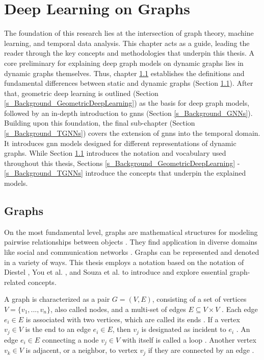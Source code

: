 \section{Deep Learning on Graphs}
\label{s_Background}

The foundation of this research lies at the intersection of graph theory, machine learning, and temporal data analysis. 
This chapter acts as a guide, leading the reader through the key concepts and methodologies that underpin this thesis. A core preliminary for explaining deep graph models on dynamic graphs lies in dynamic graphs themselves. Thus, chapter \ref{s_Background_Graphs} establishes the definitions and fundamental differences between static and dynamic graphs (Section \ref{s_Background_Graphs}). After that, geometric deep learning is outlined (Section \ref{s_Background_GeometricDeepLearning}) as the basis for deep graph models, followed by an in-depth introduction to \glspl{gnn} (Section \ref{s_Background_GNNs}). Building upon this foundation, the final sub-chapter (Section \ref{s_Background_TGNNs}) covers the extension of \glspl{gnn} into the temporal domain. It introduces \gls{gnn} models designed for different representations of dynamic graphs. While Section \ref{s_Background_Graphs} introduces the notation and vocabulary used throughout this thesis, Sections \ref{s_Background_GeometricDeepLearning} - \ref{s_Background_TGNNs} introduce the concepts that underpin the explained models.

\subsection{Graphs}
\label{s_Background_Graphs}
On the most fundamental level, graphs are mathematical structures for modeling pairwise relationships between objects \cite{diestel_graph_2017}. They find application in diverse domains like social and communication networks \cite{bronstein_geometric_2017}. Graphs can be represented and denoted in a variety of ways. This thesis employs a notation based on the notation of Diestel \cite{diestel_graph_2017}, You et al. \cite{you_roland_2022}, and Souza et al. \cite{souza_provably_2022} to introduce and explore essential graph-related concepts.

A graph is characterized as a pair $G = (V, E)$, consisting of a set of vertices ${V= \{v_1,...,v_n\}}$, also called nodes, and a multi-set of edges $E \subseteq V \times V$ \cite{diestel_graph_2017, you_roland_2022}. Each edge $e_i \in E$ is associated with two vertices, which are called its ends \cite{diestel_graph_2017}. If a vertex $v_j \in V$ is the end to an edge $e_i \in E$, then $v_j$ is designated as incident to $e_i$ \cite{diestel_graph_2017}. An edge $e_i \in E$ connecting a node $v_j \in V$ with itself is called a loop \cite{diestel_graph_2017}. Another vertex $v_k \in V$ is adjacent, or a neighbor, to vertex $v_j$ if they are connected by an edge \cite{diestel_graph_2017}. 

